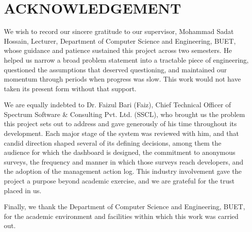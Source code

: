\chapter*{ACKNOWLEDGEMENT}

We wish to record our sincere gratitude to our supervisor, Mohammad Sadat
Hossain, Lecturer, Department of Computer Science and Engineering, BUET, whose
guidance and patience sustained this project across two semesters. He helped us
narrow a broad problem statement into a tractable piece of engineering,
questioned the assumptions that deserved questioning, and maintained our
momentum through periods when progress was slow. This work would not have taken
its present form without that support.

We are equally indebted to Dr. Faizul Bari (Faiz), Chief Technical Officer of Spectrum
Software \& Consulting Pvt. Ltd. (SSCL), who brought us the problem this project
sets out to address and gave generously of his time throughout its development.
Each major stage of the system was reviewed with him, and that candid direction
shaped several of its defining decisions, among them the audience for which the
dashboard is designed, the commitment to anonymous surveys, the frequency and
manner in which those surveys reach developers, and the adoption of the
management action log. This industry involvement gave the project a purpose beyond
academic exercise, and we are grateful for the trust placed in us.

Finally, we thank the Department of Computer Science and Engineering, BUET, for
the academic environment and facilities within which this work was carried out.
\clearpage
